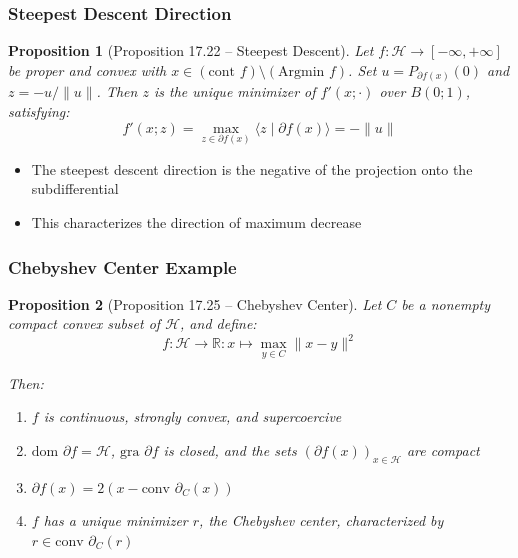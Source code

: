\documentclass[aspectratio=169,10pt]{beamer}
\newtheorem{prop}{Proposition}
\begin{document}
\begin{frame}
  \frametitle{Steepest Descent Direction}

  \begin{prop}[Proposition 17.22 -- Steepest Descent]
    Let $f: \mathcal{H} \to [-\infty, +\infty]$ be proper and convex with $x \in (\text{cont } f) \setminus (\text{Argmin } f)$. Set $u = P_{\partial f(x)}(0)$ and $z = -u/\|u\|$. Then $z$ is the unique minimizer of $f'(x; \cdot)$ over $B(0; 1)$, satisfying:
    \[
    f'(x; z) = \max_{z \in \partial f(x)} \langle z \mid \partial f(x) \rangle = -\|u\|
    \]
  \end{prop}

  \begin{itemize}
    \item The steepest descent direction is the negative of the projection onto the subdifferential
    \item This characterizes the direction of maximum decrease
  \end{itemize}
\end{frame}

\begin{frame}
  \frametitle{Chebyshev Center Example}

  \begin{prop}[Proposition 17.25 -- Chebyshev Center]
    Let $C$ be a nonempty compact convex subset of $\mathcal{H}$, and define:
    \[
    f: \mathcal{H} \to \mathbb{R}: x \mapsto \max_{y \in C} \|x - y\|^2
    \]

    Then:
    \begin{enumerate}
      \item[(i)] $f$ is continuous, strongly convex, and supercoercive
      \item[(ii)] $\text{dom } \partial f = \mathcal{H}$, $\text{gra } \partial f$ is closed, and the sets $(\partial f(x))_{x \in \mathcal{H}}$ are compact
      \item[(iv)] $\partial f(x) = 2(x - \text{conv } \partial_C(x))$
      \item[(v)] $f$ has a unique minimizer $r$, the Chebyshev center, characterized by $r \in \text{conv } \partial_C(r)$
    \end{enumerate}
  \end{prop}
\end{frame}
\end{document}

